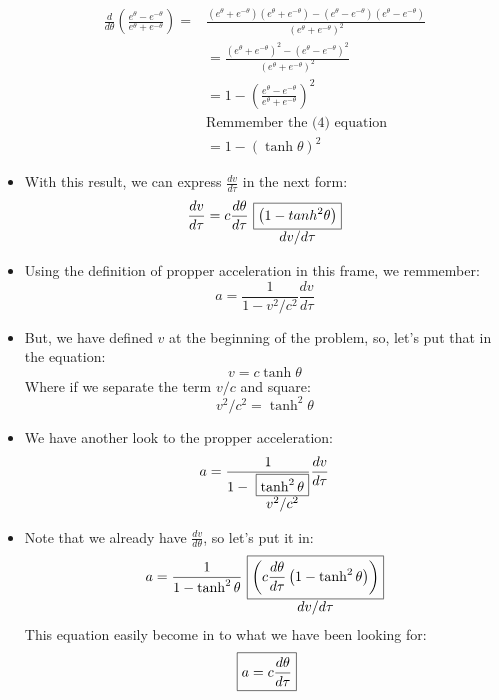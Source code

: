 \documentclass[0pt, letterpaper]{article}
\makeatletter
\newcommand{\commentedbox}[2]{%
  \mbox{
    \begin{tabular}[t]{@{}c@{}}
    $\boxed{\displaystyle#1}$\\
    #2
    \end{tabular}%
  }%
}
\makeatother
\begin{document}
\begin{itemize}
        \begin{equation}
        \begin{split}
            \frac{d}{d\theta}\left(\frac{e^{\theta}-e^{-\theta}}{e^{\theta}+e^{-\theta}}\right) = & \frac{\left(e^{\theta}+e^{-\theta}\right)\left(e^{\theta}+e^{-\theta}\right)-\left(e^{\theta}-e^{-\theta}\right)\left(e^{\theta}-e^{-\theta}\right)}{\left(e^{\theta}+e^{-\theta}\right)^2} \\
            & = \frac{\left(e^{\theta}+e^{-\theta}\right)^2-\left(e^{\theta}-e^{-\theta}\right)^2}{\left(e^{\theta}+e^{-\theta}\right)^2} \\
            & = 1 - \left(\frac{e^{\theta}-e^{-\theta}}{e^{\theta}+e^{-\theta}}\right)^2 \\
            & \text{Remmember the (4) equation} \\
            & = 1 - \left(\tanh{\theta}\right)^2
        \end{split}
        \end{equation}
    \item With this result, we can express $\frac{dv}{d\tau}$ in the next form:
        \begin{equation}
            \frac{dv}{d\tau} = c\frac{d\theta}{d\tau}\commentedbox{\left(1-tanh^2\theta\right)}{$dv/d\tau$}
        \end{equation}
    \item Using the definition of propper acceleration in this frame, we remmember:
        \begin{equation}
            a = \frac{1}{1-v^2/c^2}\frac{dv}{d\tau}
        \end{equation}
    \item But, we have defined $v$ at the beginning of the problem, so, let's put that       in the equation:
        \begin{equation*}
            v=c\tanh{\theta}
        \end{equation*}
        Where if we separate the term $v/c$ and square:
        \begin{equation}
            v^2/c^2 = \tanh^2{\theta}
        \end{equation}
    \item We have another look to the propper acceleration:
        \begin{equation*}
            a = \frac{1}{1-\commentedbox{\tanh^2{\theta}}{$v^2/c^2$}}\frac{dv}{d\tau}
        \end{equation*}
    \item Note that we already have $\frac{dv}{d\theta}$, so let's put it in:
        \begin{equation}
            a= \frac{1}{1-\tanh^2{\theta}}\commentedbox{\left(c\frac{d\theta}{d\tau}\left(1-\tanh^2{\theta}\right)\right)}{$dv/d\tau$}
        \end{equation}
    This equation easily become in to what we have been looking for:
        \begin{equation}
            \commentedbox{a = c\frac{d\theta}{d\tau}}{}
        \end{equation}
\end{itemize}
\end{document}
